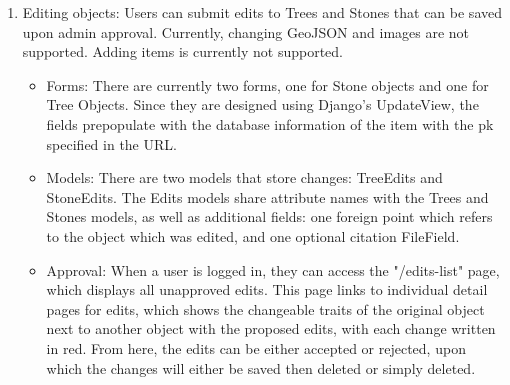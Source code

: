 \documentclass[]{article}
\begin{document}
\begin{enumerate}
\begin{itemize}
		\end{itemize} 
	\item Editing objects: Users can submit edits to Trees and Stones that can be saved upon admin approval. Currently, changing GeoJSON and images are not supported. Adding items is currently not supported. 
		\begin{itemize}
			\item Forms: There are currently two forms, one for Stone objects and one for Tree Objects. Since they are designed using Django's UpdateView, the fields prepopulate with the database information of the item with the pk specified in the URL. 
			\item Models: There are two models that store changes: TreeEdits and StoneEdits. The Edits models share attribute names with the Trees and Stones models, as well as additional fields: one foreign point which refers to the object which was edited, and one optional citation FileField. 
			\item Approval: When a user is logged in, they can access the "/edits-list" page, which displays all unapproved edits. This page links to individual detail pages for edits, which shows the changeable traits of the original object next to another object with the proposed edits, with each change written in red. From here, the edits can be either accepted or rejected, upon which the changes will either be saved then deleted or simply deleted. 
\end{itemize}
\end{enumerate} 
\end{document}
